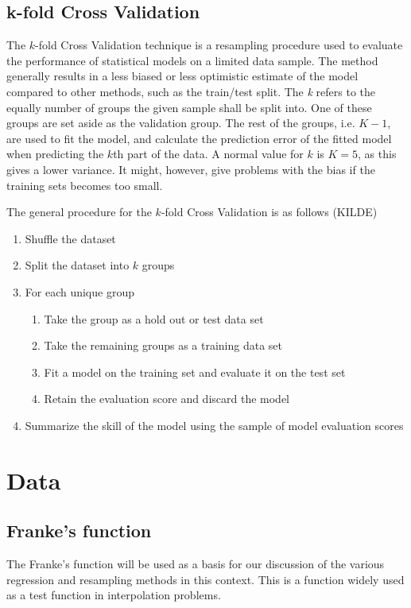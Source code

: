 \documentclass{article}
\begin{document}
\subsection{k-fold Cross Validation}
The $k$-fold Cross Validation technique is a resampling procedure used to evaluate the performance of statistical models on a limited data sample. The method generally results in a less biased or less optimistic estimate of the model compared to other methods, such as the train/test split. The \textit{k} refers to the equally number of groups the given sample shall be split into. One of these groups are set aside as the validation group. The rest of the groups, i.e. $K-1$, are used to fit the model, and calculate the prediction error of the fitted model when predicting the $k$th part of the data. A normal value for $k$ is $K=5$, as this gives a lower variance. It might, however, give problems with the bias if the training sets becomes too small.

The general procedure for the $k$-fold Cross Validation is as follows (KILDE)
\begin{enumerate}
\item Shuffle the dataset
\item Split the dataset into $k$ groups
\item For each unique group
\begin{enumerate}
\item Take the group as a hold out or test data set
\item Take the remaining groups as a training data set
\item Fit a model on the training set and evaluate it on the test set
\item Retain the evaluation score and discard the model
\end{enumerate}
	
\item Summarize the skill of the model using the sample of model evaluation scores
\end{enumerate}

\section{Data}
\subsection{Franke's function}
The Franke's function will be used as a basis for our discussion of the various regression and resampling methods in this context. This is a function  widely used as a test function in interpolation problems.
\end{document}
